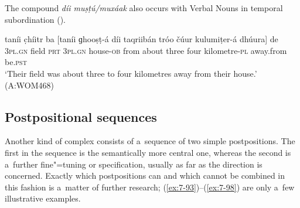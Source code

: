 The compound \textit{díi muṣṭú/muxáak} also occurs with Verbal Nouns in temporal subordination (). 



\begin{exe}
\ex
\label{ex:7-92}
\gll taníi c̣híitr ba [taníi ɡhooṣṭ-á díi taqriibán tróo čúur
  kulumiṭer-á dhúura] de \\
\textsc{3pl.gn} field \textsc{prt} \textsc{3pl.gn} house-\textsc{ob} from about three four kilometre-\textsc{pl} away.from be.\textsc{pst}  \\
\glt `Their field was about three to four kilometres away from their house.' (A:WOM468)
\end{exe}

\subsection{Postpositional sequences}
\label{subsec:7-2-4}

Another kind of complex  consists of a~sequence of two simple postpositions. The first in the sequence is the semantically more central one, whereas the second is a~further fine"=tuning or specification, usually as far as the direction is concerned. Exactly which postpositions can and which cannot be combined in this fashion is a~matter of further research; (\ref{ex:7-93})--(\ref{ex:7-98}) are only a~few illustrative examples.


